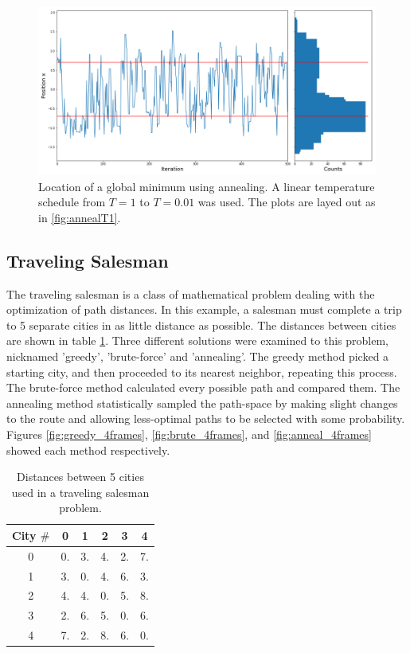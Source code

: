 \message{ !name(Assn1.tex)}\documentclass[twocolumn]{article}
\begin{document}
\begin{figure}
	\centering
	\includegraphics[width=\linewidth]{anneal_full}
	\caption{Location of a global minimum using annealing. A linear temperature schedule from $T=1$ to $T=0.01$ was used. The plots are layed out as in \ref{fig:annealT1}.}
	\label{fig:anneal_full}
\end{figure}

\subsection{Traveling Salesman}
The traveling salesman is a class of mathematical problem dealing with the optimization of path distances. In this example, a salesman must complete a trip to 5 separate cities in as little distance as possible. The distances between cities are shown in table \ref{tab:5cities}. Three different solutions were examined to this problem, nicknamed 'greedy', 'brute-force' and 'annealing'. The greedy method picked a starting city, and then proceeded to its nearest neighbor, repeating this process. The brute-force method calculated every possible path and compared them. The annealing method statistically sampled the path-space by making slight changes to the route and allowing less-optimal paths to be selected with some probability. Figures \ref{fig:greedy_4frames}, \ref{fig:brute_4frames}, and \ref{fig:anneal_4frames} showed each method respectively. 
\begin{table}
\begin{center}
	\begin{tabular}{|c|c|c|c|c|c|}
		\hline
		City $\#$ & 0 & 1 & 2 & 3 & 4 \\
		\hline
		0 & 0. & 3. & 4. & 2. & 7. \\
		\hline
		1 & 3. & 0. & 4. & 6. & 3. \\
		\hline
		2 & 4. & 4. & 0. & 5. & 8. \\
		\hline
		3 & 2. & 6. & 5. & 0. & 6. \\
		\hline
		4 & 7. & 2. & 8. & 6. & 0. \\
		\hline
	\end{tabular}
	\caption{Distances between 5 cities used in a traveling salesman problem.}
	\label{tab:5cities}
\end{center}
\end{table}
\end{document}
